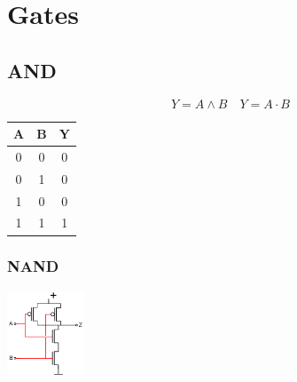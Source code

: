 \section{Gates}
\subsection{AND}
\begin{center}
    \begin{minipage}{0.55\linewidth}
        \begin{equation*}
            Y = A \land B \quad Y = A \cdot B
        \end{equation*}
        \begin{center}
        \end{center}
    \end{minipage}
    \hfill
    \begin{minipage}{0.35\linewidth}
        \begin{tabular}{|c c|c|}
            \hline
            A & B & Y\\
            \hline
            0 & 0 & 0\\
            0 & 1 & 0\\
            1 & 0 & 0\\
            1 & 1 & 1\\
            \hline
        \end{tabular}
    \end{minipage}
    \begin{minipage}[t]{0.45\linewidth}
        \subsubsection{NAND}
        \includegraphics[height = 25mm]{images/nand.png}
    \end{minipage}
    \begin{minipage}[t]{0.45\linewidth}

\end{minipage}
\end{center}
